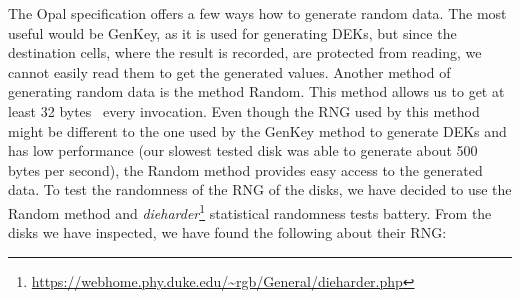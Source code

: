 \REPLACEME

The Opal specification offers a few ways how to generate random data. The most useful would be GenKey, as it is used for generating DEKs, but since the destination cells, where the result is recorded, are protected from reading, we cannot easily read them to get the generated values.
Another method of generating random data is the method Random. This method allows us to get at least 32 bytes~\cite{tcg-opal2} every invocation. Even though the RNG used by this method might be different to the one used by the GenKey method to generate DEKs and has low performance (our slowest tested disk was able to generate about 500 bytes per second), the Random method provides easy access to the generated data.
To test the randomness of the RNG of the disks, we have decided to use the Random method and \emph{dieharder}\footnote{\url{https://webhome.phy.duke.edu/~rgb/General/dieharder.php}} statistical randomness tests battery.
From the disks we have inspected, we have found the following about their RNG:

